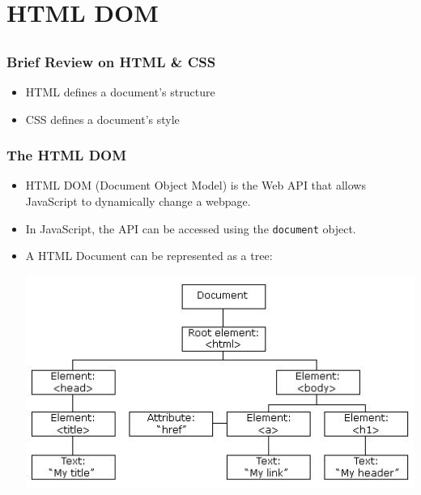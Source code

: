 \documentclass[handout,12pt]{beamer}
\begin{document}
\section{HTML DOM}
\subsection{}
\begin{frame}
	\frametitle{Brief Review on HTML \& CSS}
	\begin{itemize}
		\item HTML defines a document's structure
		\item CSS defines a document's style
	\end{itemize}
\end{frame}

\begin{frame}
	\frametitle{The HTML DOM}
	\begin{itemize}
		\item HTML DOM (Document Object Model) is the Web API that allows JavaScript to dynamically change a webpage.
		\item In JavaScript, the API can be accessed using the \texttt{document} object.
		\item A HTML Document can be represented as a tree:
\begin{center}
\includegraphics[width=0.7\linewidth]{HTML-DOM}
\end{center}

	\end{itemize}
\end{frame}
\end{document}
